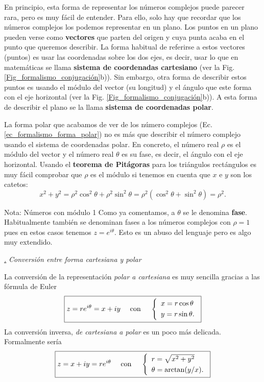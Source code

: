 \documentclass[a4paper,11pt]{book} %
\numberwithin{equation}{chapter}
\def\subsubiContadorIt{\par\addtocounter{subsubsection}{1}\underline{\it\thesubsubsection.}\hskip0.5cm \setcounter{subsubsubsectionIt}{0}}
\newcommand{\SubsubiIt}[1]{
		\subsubiContadorIt \textit{#1}
	}
\newcounter{subsubsubsectionIt}[subsubsection]
\begin{document}
	En principio, esta forma de representar los números complejos puede parecer rara, pero es muy fácil de entender. Para ello, solo hay que recordar que los números complejos los podemos representar en un plano. Los puntos en un plano pueden verse como \textbf{vectores} que parten del origen y cuya punta acaba en el punto que queremos describir. La forma habitual de referirse a estos vectores (puntos) es usar las coordenadas sobre los dos ejes, es decir, usar lo que en matemáticas se llama \textbf{sistema de coordenadas cartesiano} (ver la Fig. \ref{Fig_formalismo_conjugación}b)). Sin embargo, otra forma de describir estos puntos es usando el módulo del vector (su longitud) y el ángulo que este forma con el eje horizontal (ver la Fig. \ref{Fig_formalismo_conjugación}b)). A esta forma de describir el plano se la llama \textbf{sistema de coordenadas polar}.
	
	La forma polar que acabamos de ver de los número complejos (Ec. \ref{ec_formalismo_forma_polar}) no es más que describir el número complejo usando el sistema de coordenadas polar. En concreto, el número real $\rho$ es el módulo del vector y el número real $\theta$ es su fase, es decir, el ángulo con el eje horizontal. Usando el \textbf{teorema de Pitágoras} para los triángulos rectángulos es muy fácil comprobar que $\rho$ es el módulo si tenemos en cuenta que $x$ e $y$ son los catetos:
	\begin{equation}
	x^2 + y^2 = \rho^2 \cos^2 \theta + \rho^2 \sin^2 \theta = \rho^2 (\cos^2 \theta +  \sin^2 \theta) =  \rho^2.
	\end{equation}

	\begin{mybox_blue}{Nota: Números con módulo 1}
	Como ya comentamos, a $\theta$ se le denomina \textbf{fase}. Habitualmente también se denominan fases a los números complejos con $\rho =1$ pues en estos casos tenemos $z = e^{i \theta}$. Esto es un abuso del lenguaje pero es algo muy extendido.
	\end{mybox_blue}

		
			\SubsubiIt{Conversión entre forma cartesiana y polar}

La conversión de la representación \textit{polar a cartesiana} es muy sencilla gracias a las fórmula de Euler
	\begin{equation}
	\boxed{z = r e^{i\theta} = x + i y ~~~\hbox{ con }  ~~~\left\{\begin{array}{l} x=r \cos \theta \\ \rule{0mm}{4mm} y = r\sin \theta . \end{array} \right. }
	\end{equation}
La conversión inversa, \textit{de cartesiana a polar} es un poco más delicada. Formalmente sería
	\begin{equation} \label{ec_formalismo_de_cartesiana_a_polar}
	\boxed{z = x + i y  = r e^{i\theta} ~~~ \hbox{ con } ~~~ \left\{\begin{array}{l} r=\sqrt{x^2+y^2} \\  \rule{0mm}{4mm} \theta = \arctan(y/x) . \end{array} \right.} 
	\end{equation}
\end{document}

